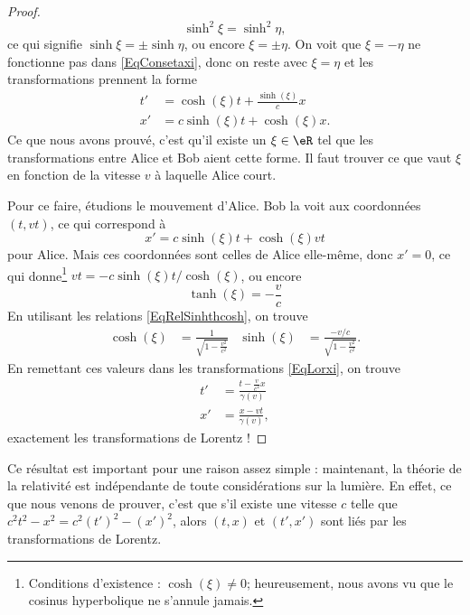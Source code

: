 \begin{proof}
	\[
	  \sinh^2\xi=\sinh^2\eta,
	\]
	ce qui signifie $\sinh\xi=\pm\sinh\eta$, ou encore $\xi=\pm\eta$. On voit que $\xi=-\eta$ ne fonctionne pas dans \eqref{EqConsetaxi}, donc on reste avec $\xi=\eta$ et les transformations prennent la forme
	\begin{equation}	\label{EqLorxi}
		\begin{split}
			t'&=\cosh(\xi) t+\frac{ \sinh(\xi) }{ c }x\\
			x'&=c\sinh(\xi) t+\cosh(\xi)x.
		\end{split}
	\end{equation}
	Ce que nous avons prouvé, c'est qu'il existe un $\xi\in\eR$ tel que les transformations entre Alice et Bob aient cette forme. Il faut trouver ce que vaut $\xi$ en fonction de la vitesse $v$ à laquelle Alice court.

	Pour ce faire, étudions le mouvement d'Alice. Bob la voit aux coordonnées $(t,vt)$, ce qui correspond à
	\[
	  x'=c\sinh(\xi)t+\cosh(\xi)vt
	\]
	pour Alice. Mais ces coordonnées sont celles de Alice elle-même, donc $x'=0$, ce qui donne\footnote{Conditions d'existence : $\cosh(\xi)\neq 0$; heureusement, nous avons vu que le cosinus hyperbolique ne s'annule jamais.} $vt=- c\sinh(\xi)t/ \cosh(\xi)$, ou encore
	\begin{equation}
		\tanh(\xi)=-\frac{ v }{ c }
	\end{equation}
	En utilisant les relations \eqref{EqRelSinhthcosh}, on trouve
	\begin{align}
		\cosh(\xi)&=\frac{1}{ \sqrt{1-\frac{ v^2 }{ c^2 }} }&\sinh(\xi)&=\frac{ -v/c }{ \sqrt{1-\frac{ v^2 }{ c^2 }} }.
	\end{align}
	En remettant ces valeurs dans les transformations \eqref{EqLorxi}, on trouve
	\begin{align}
		t'&=\frac{ t-\frac{ v }{ c^2 }x }{ \gamma(v) }\\
		x'&=\frac{ x-vt }{ \gamma(v) },
	\end{align}
	exactement les transformations de Lorentz !

\end{proof}


Ce résultat est important pour une raison assez simple : maintenant, la théorie de la relativité est indépendante de toute considérations sur la lumière. En effet, ce que nous venons de prouver, c'est que s'il existe une vitesse $c$ telle que $c^2t^2-x^2=c^2(t')^2-(x')^2$, alors $(t,x)$ et $(t',x')$ sont liés par les transformations de Lorentz.

